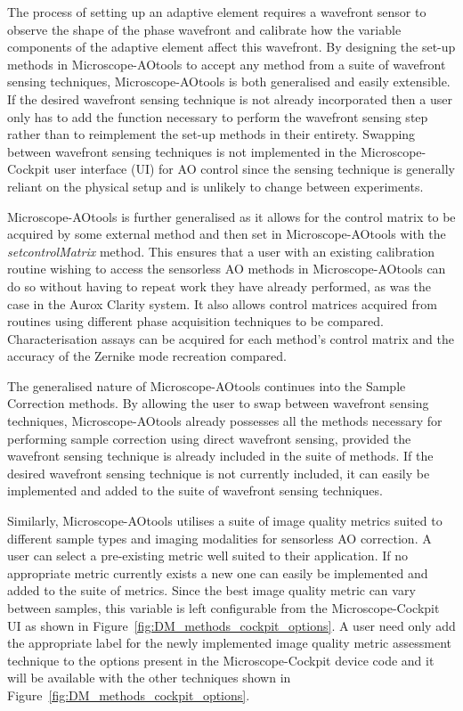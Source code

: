 The process of setting up an adaptive element requires a wavefront sensor 
to observe the shape of the phase wavefront and calibrate how the variable 
components of the adaptive element affect this wavefront. By designing the 
set-up methods in Microscope-AOtools to accept any method from a suite of 
wavefront sensing techniques, Microscope-AOtools is both generalised and 
easily extensible. If the desired wavefront sensing technique is not 
already incorporated then a user only has to add the function necessary to 
perform the wavefront sensing step rather than to reimplement the set-up 
methods in their entirety. Swapping between wavefront sensing techniques is 
not implemented in the Microscope-Cockpit user interface (UI) for AO control since the 
sensing technique is generally reliant on the physical setup and is 
unlikely to change between experiments.

Microscope-AOtools is further generalised as it allows for the control 
matrix to be acquired by some external method and then set in 
Microscope-AOtools with the \textit{set\textunderscore controlMatrix} 
method. This ensures that a user with an existing calibration routine 
wishing to access the sensorless AO methods in Microscope-AOtools can do so 
without having to repeat work they have already performed, as was the case in 
the Aurox Clarity system. It also allows control matrices acquired from 
routines using different phase acquisition techniques to be compared. 
Characterisation assays can be acquired for each method's control matrix and 
the accuracy of the Zernike mode recreation compared.

The generalised nature of Microscope-AOtools continues into the Sample 
Correction methods. By allowing the user to swap between wavefront sensing 
techniques, Microscope-AOtools already possesses all the methods necessary 
for performing sample correction using direct wavefront sensing, provided 
the wavefront sensing technique is already included in the suite of 
methods. If the desired wavefront sensing technique is not currently included, 
it can easily be implemented and added  to the suite of wavefront sensing 
techniques. 

Similarly, Microscope-AOtools utilises a suite of image quality 
metrics suited to different sample types and imaging modalities for sensorless 
AO correction. A user can select a pre-existing metric well suited to their 
application. If no appropriate metric currently exists a new one can easily be 
implemented and added  to the suite of metrics. Since the best image quality 
metric can vary between samples, this variable is left configurable from 
the Microscope-Cockpit UI as shown in Figure~\ref{fig:DM_methods_cockpit_options}. A 
user need only add the appropriate label for the newly implemented image 
quality metric assessment technique to the options present in the 
Microscope-Cockpit device code and it will be available with the other 
techniques shown in
Figure~\ref{fig:DM_methods_cockpit_options}.

